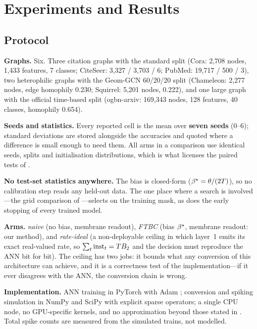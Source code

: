 \section{Experiments and Results}
\label{sec:exp}

\subsection{Protocol}
\label{sec:protocol}

\textbf{Graphs.} Six. Three citation graphs with the standard split (Cora: 2{,}708 nodes,
1{,}433 features, 7 classes; CiteSeer: 3{,}327 / 3{,}703 / 6; PubMed: 19{,}717 / 500 / 3), two
heterophilic graphs with the Geom-GCN 60/20/20 split (Chameleon: 2{,}277 nodes, edge homophily
0.230; Squirrel: 5{,}201 nodes, 0.222), and one large graph with the official time-based split
(ogbn-arxiv: 169{,}343 nodes, 128 features, 40 classes, homophily 0.654).

\textbf{Seeds and statistics.} Every reported cell is the mean over \textbf{seven seeds} (0--6);
standard deviations are stored alongside the accuracies and quoted where a difference is small
enough to need them. All arms in a comparison use identical seeds, splits and initialisation
distributions, which is what licenses the paired tests of .

\textbf{No test-set statistics anywhere.} The bias is closed-form ($\beta^{\star} = \theta/(2T)$), so
no calibration step reads any held-out data. The one place where a search is involved---the grid
comparison of ---selects on the training mask, as does the early stopping of
every trained model.

\textbf{Arms.} \emph{naive} (no bias, membrane readout), \emph{FTBC} (bias $\beta^{\star}$, membrane
readout: our method), and \emph{rate-ideal} (a non-deployable ceiling in which layer~1 emits its
exact real-valued rate, so $\sum_{t}\mathrm{inst}_{t} = TB_{2}$ and the decision must reproduce the
ANN bit for bit). The ceiling has two jobs: it bounds what any conversion of this architecture can
achieve, and it is a correctness test of the implementation---if it ever disagrees with the ANN, the
conversion chain is wrong.

\textbf{Implementation.} ANN training in PyTorch \citep{paszke2019pytorch} with Adam
\citep{kingma2015adam}; conversion and spiking simulation in NumPy \citep{harris2020array} and SciPy
\citep{virtanen2020scipy} with explicit sparse operators; a single CPU node, no GPU-specific
kernels, and no approximation beyond those stated in . Total spike counts are
measured from the simulated trains, not modelled.


